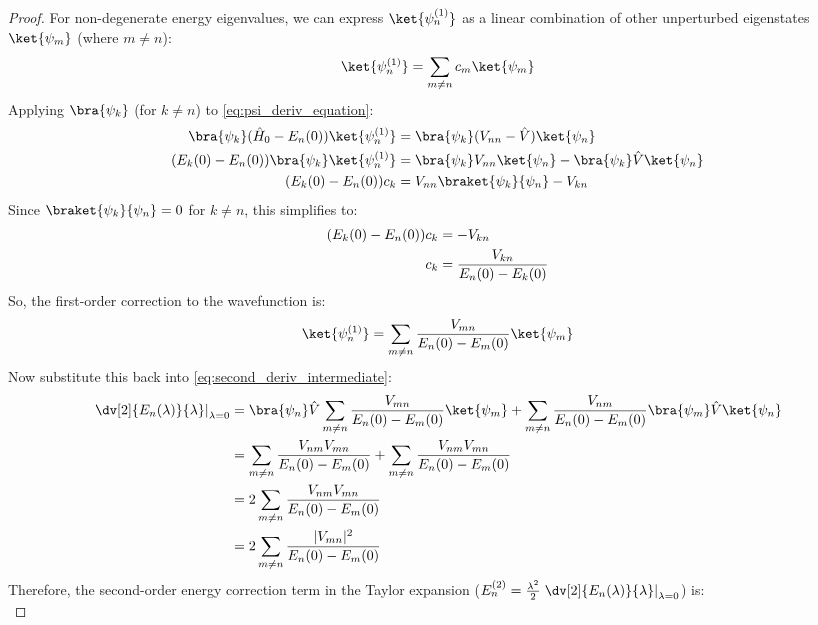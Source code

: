 \begin{proof}
  For non-degenerate energy eigenvalues, we can express
  $\ket{\psi_n^{(1)}}$ as a linear combination of other unperturbed
  eigenstates $\ket{\psi_m}$ (where $m \ne n$):
  \begin{equation}
    \ket{\psi_n^{(1)}} = \sum_{m \ne n} c_m \ket{\psi_m}
  \end{equation}
  Applying $\bra{\psi_k}$ (for $k \ne n$) to \eqref{eq:psi_deriv_equation}:
  \begin{align}
    \bra{\psi_k}(\hat H_0 - E_n(0)) \ket{\psi_n^{(1)}} &=
    \bra{\psi_k}(V_{nn} - \hat V) \ket{\psi_n} \\
    (E_k(0) - E_n(0)) \bra{\psi_k}\ket{\psi_n^{(1)}} &=
    \bra{\psi_k}V_{nn}\ket{\psi_n} - \bra{\psi_k}\hat
    V\ket{\psi_n} \notag \\
    (E_k(0) - E_n(0)) c_k &= V_{nn}\braket{\psi_k}{\psi_n} - V_{kn} \notag
  \end{align}
  Since $\braket{\psi_k}{\psi_n} = 0$ for $k \ne n$, this simplifies to:
  \begin{align} \label{eq:coefficient_c_k}
    (E_k(0) - E_n(0)) c_k &= -V_{kn} \\
    c_k &= \frac{V_{kn}}{E_n(0) - E_k(0)} \notag
  \end{align}
  So, the first-order correction to the wavefunction is:
  \begin{equation} \label{eq:psi_n_first_order_correction}
    \ket{\psi_n^{(1)}} = \sum_{m \ne n} \frac{V_{mn}}{E_n(0) -
    E_m(0)} \ket{\psi_m}
  \end{equation}
  Now substitute this back into \eqref{eq:second_deriv_intermediate}:
  \begin{align} \label{eq:second_deriv_final_step}
    \left.\dv[2]{E_n(\lambda)}{\lambda}\right|_{\lambda=0} &=
    \bra{\psi_n}\hat V \sum_{m \ne n} \frac{V_{mn}}{E_n(0) -
    E_m(0)} \ket{\psi_m} + \sum_{m \ne n} \frac{V_{nm}}{E_n(0) -
    E_m(0)} \bra{\psi_m} \hat V \ket{\psi_n} \\
    &= \sum_{m \ne n} \frac{V_{nm} V_{mn}}{E_n(0) - E_m(0)} +
    \sum_{m \ne n} \frac{V_{nm} V_{mn}}{E_n(0) - E_m(0)} \notag \\
    &= 2 \sum_{m \ne n} \frac{V_{nm} V_{mn}}{E_n(0) - E_m(0)} \notag \\
    &= 2 \sum_{m \ne n} \frac{|V_{mn}|^2}{E_n(0) - E_m(0)} \notag
  \end{align}
  Therefore, the second-order energy correction term in the Taylor
  expansion ($E_n^{(2)} = \frac{\lambda^2}{2}
  \left.\dv[2]{E_n(\lambda)}{\lambda}\right|_{\lambda=0}$) is:
  \begin{equation} \label{eq:final_second_order_energy_correction_formula}

\end{equation}
\end{proof}
